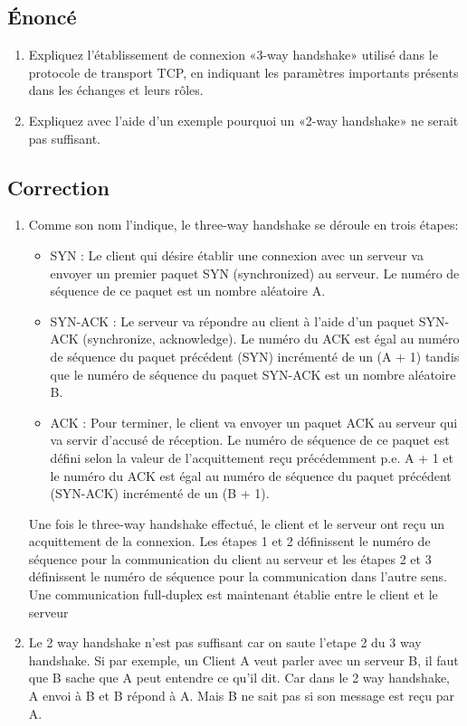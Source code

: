 \documentclass[a4paper, 11pt, titlepage]{article}
\begin{document}
\subsection{\'Enoncé}
\begin{enumerate}[label=(\alph*)]
\item Expliquez l’établissement de connexion «3-way handshake» utilisé dans le protocole de transport TCP, en indiquant les paramètres importants présents dans les échanges et leurs rôles.
\item Expliquez avec l’aide d’un exemple pourquoi un «2-way handshake» ne serait pas suffisant.
\end{enumerate}

\subsection{Correction}
\begin{enumerate}[label=(\alph*)]
\item
Comme son nom l'indique, le three-way handshake se déroule en trois étapes:

\begin{itemize}

\item SYN : Le client qui désire établir une connexion avec un serveur va envoyer un premier paquet SYN (synchronized) au serveur. Le numéro de séquence de ce paquet est un nombre aléatoire A.
\item SYN-ACK : Le serveur va répondre au client à l'aide d'un paquet SYN-ACK (synchronize, acknowledge). Le numéro du ACK est égal au numéro de séquence du paquet précédent (SYN) incrémenté de un (A + 1) tandis que le numéro de séquence du paquet SYN-ACK est un nombre aléatoire B.
\item ACK : Pour terminer, le client va envoyer un paquet ACK au serveur qui va servir d'accusé de réception. Le numéro de séquence de ce paquet est défini selon la valeur de l'acquittement reçu précédemment p.e. A + 1 et le numéro du ACK est égal au numéro de séquence du paquet précédent (SYN-ACK) incrémenté de un (B + 1).
\end{itemize}

Une fois le three-way handshake effectué, le client et le serveur ont reçu un acquittement de la connexion. Les étapes 1 et 2 définissent le numéro de séquence pour la communication du client au serveur et les étapes 2 et 3 définissent le numéro de séquence pour la communication dans l'autre sens. Une communication full-duplex est maintenant établie entre le client et le serveur

\item
Le 2 way handshake n'est pas suffisant car on saute l'etape 2 du 3 way handshake. Si par exemple, un Client A veut parler avec un serveur B, il faut que B sache que A peut entendre ce qu'il dit. Car dans le 2 way handshake, A envoi à B et B répond à A. Mais B ne sait pas si son message est reçu par A.

\end{enumerate}
\end{document}
